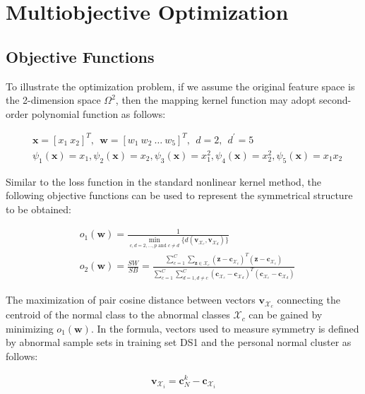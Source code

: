 \section{Multiobjective Optimization}

\subsection{Objective Functions}

To illustrate the optimization problem, if we assume the original feature space is the 2-dimension space $\Omega^2$, then the mapping kernel function may adopt second-order polynomial function as follows:

\begin{align}
\nonumber
&\mathbf{x}=[x_1~ x_2]^T,~~ \mathbf{w}=[w_1~ w_2~ \dots~ w_5]^T,~~d=2, ~~d^\prime=5\\
&\psi_1(\mathbf{x})=x_1, \psi_2(\mathbf{x})=x_2, \psi_3(\mathbf{x})=x_1^2, \psi_4(\mathbf{x})=x_2^2, \psi_5(\mathbf{x})=x_1x_2
\label{eq5}
\end{align}

Similar to the loss function in the standard nonlinear kernel method, the following objective functions can be used to represent the symmetrical structure to be obtained:

\begin{align}
\label{eq:obj}
&o_1(\mathbf{w}) = \frac{1}{\underset{c,d=2,\dots,p \text{ and } c\neq d }{\min}\{d(\mathbf{v}_{\mathcal{X}_c},\mathbf{v}_{\mathcal{X}_d})\}} \\ %
\nonumber 
&o_2(\mathbf{w}) = \frac{SW}{SB}=\frac{\sum_{c=1}^{C}  \sum_{\mathbf{z} \in \mathcal{X}_c}   (\mathbf{z}-\mathbf{c}_{\mathcal{X}_c})^T(\mathbf{z}-\mathbf{c}_{\mathcal{X}_c})}{\sum_{c=1}^{C}\sum_{d=1, d\neq c}^{C}  (\mathbf{c}_{\mathcal{X}_c}-\mathbf{c}_{\mathcal{X}_d})^T(\mathbf{c}_{\mathcal{X}_c}-\mathbf{c}_{\mathcal{X}_d}) }
\end{align}

The maximization of pair cosine distance between vectors $\mathbf{v}_{\mathcal{X}_c}$ connecting the centroid of the normal class to the abnormal classes $\mathcal{X}_c$ can be gained by minimizing $o_1(\mathbf{w})$. In the formula, vectors used to measure symmetry is defined by abnormal sample sets in training set DS1 and the personal normal cluster as follows:

\begin{align}
\mathbf{v}_{\mathcal{X}_i} = \mathbf{c}^k_N -  \mathbf{c}_{\mathcal{X}_i}
\end{align}

